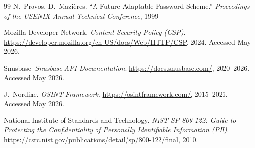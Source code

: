 \begin{thebibliography}{99}
N.~Provos, D.~Mazi\`eres.
``A Future-Adaptable Password Scheme.''
\textit{Proceedings of the USENIX Annual Technical Conference}, 1999.

Mozilla Developer Network.
\textit{Content Security Policy (CSP)}.
\url{https://developer.mozilla.org/en-US/docs/Web/HTTP/CSP}, 2024.
Accessed May 2026.

Snusbase.
\textit{Snusbase API Documentation}.
\url{https://docs.snusbase.com/}, 2020--2026.
Accessed May 2026.

J.~Nordine.
\textit{OSINT Framework}.
\url{https://osintframework.com/}, 2015--2026.
Accessed May 2026.

National Institute of Standards and Technology.
\textit{NIST SP 800-122: Guide to Protecting the Confidentiality of
Personally Identifiable Information (PII)}.
\url{https://csrc.nist.gov/publications/detail/sp/800-122/final}, 2010.

\end{thebibliography}
